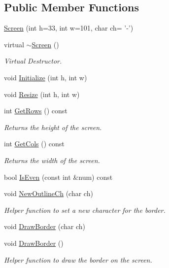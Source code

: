 \subsection*{Public Member Functions}
\begin{DoxyCompactItemize}
\item 
\hyperlink{classScreen_a932b81c3d221d644cc40ffe9003515a5}{Screen} (int h=33, int w=101, char ch= '-\/')
\item 
virtual \hyperlink{classScreen_a4243bc17596af96415b09ac48205676d}{$\sim$\-Screen} ()
\begin{DoxyCompactList}\small\item\em Virtual Destructor. \end{DoxyCompactList}\item 
void \hyperlink{classScreen_a455b38b1ac9b18bd67ecd2e056dff909}{Initialize} (int h, int w)
\item 
void \hyperlink{classScreen_a11f9842c836301989f7c3d84eb043700}{Resize} (int h, int w)
\item 
int \hyperlink{classScreen_aa12cc4ea36f5d2ac98b3c7334616acbc}{Get\-Rows} () const 
\begin{DoxyCompactList}\small\item\em Returns the height of the screen. \end{DoxyCompactList}\item 
int \hyperlink{classScreen_a223cd8821b2b8006c61545ff41aa0091}{Get\-Cols} () const 
\begin{DoxyCompactList}\small\item\em Returns the width of the screen. \end{DoxyCompactList}\item 
bool \hyperlink{classScreen_af7a18ec4e53fb371293e9ebcc23b7e2b}{Is\-Even} (const int \&num) const 
\item 
void \hyperlink{classScreen_a27dcfac6e64ab72059d0801dd9714d7a}{New\-Outline\-Ch} (char ch)
\begin{DoxyCompactList}\small\item\em Helper function to set a new character for the border. \end{DoxyCompactList}\item 
void \hyperlink{classScreen_abe4420082458330e5c853c342b201956}{Draw\-Border} (char ch)
\item 
void \hyperlink{classScreen_a146a94183c6c610ae8a619521fc9d102}{Draw\-Border} ()
\begin{DoxyCompactList}\small\item\em Helper function to draw the border on the screen. \end{DoxyCompactList}\item 

\end{DoxyCompactItemize}

